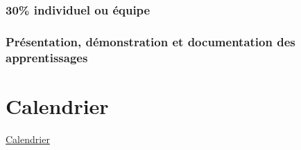 \documentclass[
]{book}
\begin{document}
\hypertarget{individuel-ou-uxe9quipe}{%
\subsection{30\% individuel ou équipe}\label{individuel-ou-uxe9quipe}}

\hypertarget{pruxe9sentation-duxe9monstration-et-documentation-des-apprentissages}{%
\subsection{Présentation, démonstration et documentation des apprentissages}\label{pruxe9sentation-duxe9monstration-et-documentation-des-apprentissages}}

\hypertarget{calendrier}{%
\chapter{Calendrier}\label{calendrier}}

\href{https://www.cmontmorency.qc.ca/wp-content/uploads/images/college/administration/CALENDRIER-SCOLAIRE-2020-2021.pdf}{Calendrier}
\end{document}
